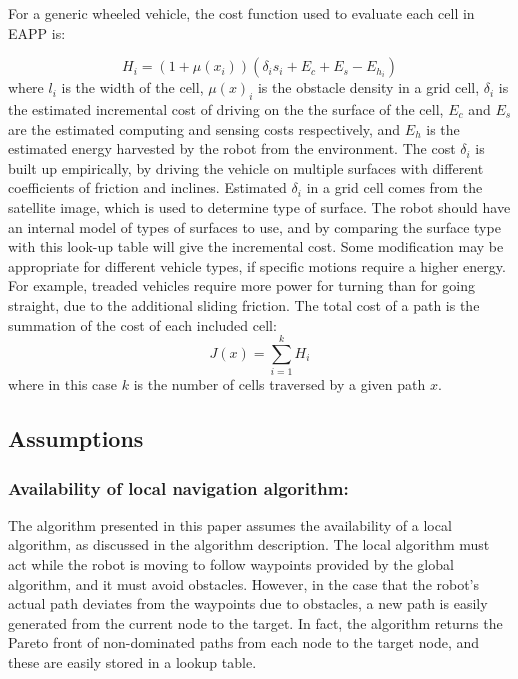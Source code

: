 \documentclass[journal]{IEEEtran}
\begin{document}
For a generic wheeled vehicle, the cost function used to evaluate each cell in EAPP is:

\begin{equation}
H_i = (1 + \mu(x_i))(\delta_i s_{i} + E_c + E_s - E_{h_i})
\end{equation}
where $l_i$ is the width of the cell, $\mu(x)_i$ is the obstacle density in a grid cell, $\delta_i$ is the estimated incremental cost of driving on the the surface of the cell, $E_c$ and $E_s$ are the estimated computing and sensing costs respectively, and $E_h$ is the estimated energy harvested by the robot from the environment. 
The cost $\delta_i$ is built up empirically, by driving the vehicle on multiple surfaces with different coefficients of friction and inclines.
Estimated $\delta_i$ in a grid cell comes from the satellite image, which is used to determine type of surface. 
The robot should have an internal model of types of surfaces to use, and by comparing the surface type with this  look-up table will give the incremental cost.
Some modification may be appropriate for different vehicle types, if specific motions require a higher energy. 
For example, treaded vehicles require more power for turning than for going straight, due to the additional sliding friction.
The total cost of a path is the summation of the cost of each included cell: 
\begin{equation}
J(x) = \sum_{i=1}^k H_i
\end{equation}
where in this case $k$ is the number of cells traversed by a given path $x$.

\subsection{Assumptions}
\subsubsection{Availability of local navigation algorithm:} The algorithm presented in this paper assumes the availability of a local algorithm, as discussed in the algorithm description. 
The local algorithm must act while the robot is moving to follow waypoints provided by the global algorithm, and it must avoid obstacles. 
However, in the case that the robot's actual path deviates from the waypoints due to obstacles, a new path is easily generated from the current node to the target. 
In fact, the algorithm returns the Pareto front of non-dominated paths from each node to the target node, and these are easily stored in a lookup table. 
\end{document}
